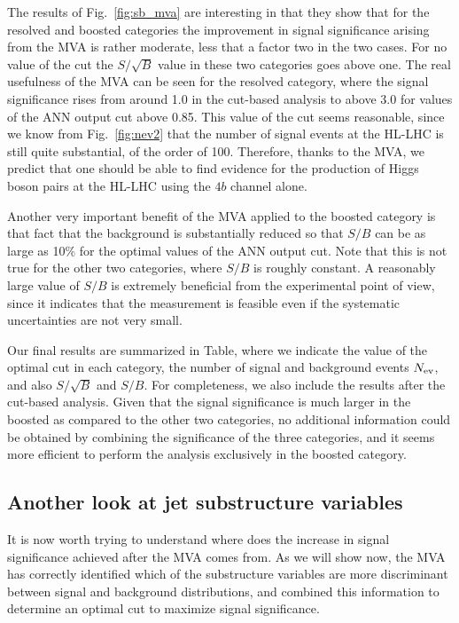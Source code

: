 The results of Fig.~\ref{fig:sb_mva} are interesting in that they show
that for the resolved and boosted categories the improvement in signal
significance arising from the MVA is rather moderate, less that a factor two
in the two cases.
%
For no value of the cut the $S/\sqrt{B}$ value in these two categories
goes above one.
%
The real usefulness of the MVA can be seen for the resolved category,
where the signal significance rises from around 1.0 in the cut-based
analysis to above 3.0 for values of the ANN output cut above 0.85.
%
This value of the cut seems reasonable, since we know from Fig.~\ref{fig:nev2}
that the number of signal events at the HL-LHC is still quite substantial,
of the order of 100.
%
Therefore, thanks to the MVA, we predict that one should be able
to find evidence for the production of Higgs boson pairs
at the HL-LHC using the $4b$ channel alone.

Another very important benefit of the MVA applied to the boosted
category is that fact that the background is substantially
reduced so that $S/B$ can be as large as 10\% for the optimal
values of the ANN output cut.
%
Note that this is not true for the other two categories,
where $S/B$ is roughly constant.
%
A reasonably large value of $S/B$ is extremely beneficial
from the experimental point of view, since it indicates
that the measurement is feasible even if the
systematic uncertainties are not very small.

Our final results are summarized in Table, where we indicate
the value of the optimal cut in each category,
the number of signal and background events $N_{\rm ev}$,
and also $S/\sqrt{B}$ and $S/B$.
%
For completeness, we also include the results after the cut-based
analysis.
%
Given that the signal significance is much larger in the boosted as
compared to the other two categories, no additional information
could be obtained by combining the significance of the three
categories, and it seems more efficient to perform
the analysis exclusively in the boosted category.




\subsection{Another look at jet substructure variables}

It is now worth trying to understand where does the increase in signal significance
achieved after the MVA comes from.
%
As we will show now, the MVA has correctly identified which of the substructure
variables are more discriminant between signal and background distributions,
and combined this information to determine an optimal cut to maximize signal
significance.

